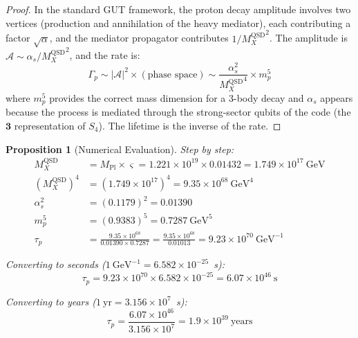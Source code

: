 \documentclass[11pt,a4paper]{article}
\newtheorem{proposition}[theorem]{Proposition}
\theoremstyle{definition}
\theoremstyle{remark}
\newcommand{\strain}{\varsigma}
\newcommand{\Mpl}{M_{\mathrm{Pl}}}
\newcommand{\MX}{{M_X^{\mathrm{QSD}}}}
\begin{document}
\begin{proof}
In the standard GUT framework, the proton decay amplitude involves two vertices (production and annihilation of the heavy mediator), each contributing a factor $\sqrt{\alpha}$, and the mediator propagator contributes $1/\MX^2$. The amplitude is $\mathcal{A} \sim \alpha_s/\MX^2$, and the rate is:
\begin{equation}
\Gamma_p \sim |\mathcal{A}|^2 \times (\text{phase space}) \sim \frac{\alpha_s^2}{\MX^4} \times m_p^5
\end{equation}
where $m_p^5$ provides the correct mass dimension for a 3-body decay and $\alpha_s$ appears because the process is mediated through the strong-sector qubits of the code (the $\mathbf{3}$ representation of $S_4$). The lifetime is the inverse of the rate.
\end{proof}

\begin{proposition}[Numerical Evaluation]
\label{prop:proton_num}
Step by step:
\begin{align}
\MX &= \Mpl \times \strain = 1.221 \times 10^{19} \times 0.01432 = 1.749 \times 10^{17}~\text{GeV} \\[4pt]
(\MX)^4 &= (1.749 \times 10^{17})^4 = 9.35 \times 10^{68}~\text{GeV}^4 \\[4pt]
\alpha_s^2 &= (0.1179)^2 = 0.01390 \\[4pt]
m_p^5 &= (0.9383)^5 = 0.7287~\text{GeV}^5 \\[4pt]
\tau_p &= \frac{9.35 \times 10^{68}}{0.01390 \times 0.7287} = \frac{9.35 \times 10^{68}}{0.01013} = 9.23 \times 10^{70}~\text{GeV}^{-1}
\end{align}

Converting to seconds ($1~\text{GeV}^{-1} = 6.582 \times 10^{-25}$~s):
\begin{equation}
\tau_p = 9.23 \times 10^{70} \times 6.582 \times 10^{-25} = 6.07 \times 10^{46}~\text{s}
\end{equation}

Converting to years ($1~\text{yr} = 3.156 \times 10^7$~s):
\begin{equation}
\tau_p = \frac{6.07 \times 10^{46}}{3.156 \times 10^7} = \boxed{1.9 \times 10^{39}~\text{years}}
\end{equation}
\end{proposition}
\end{document}
